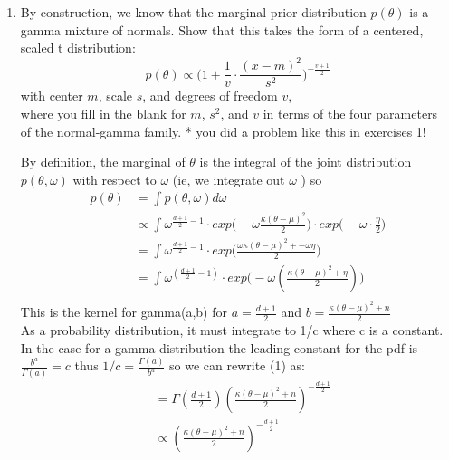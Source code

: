\documentclass{homework}
\begin{document}
\begin{enumerate}[label=(\Alph*)]
\item By construction, we know that the marginal prior distribution $p(\theta)$ is a gamma mixture of normals. Show that this takes the form of a centered, scaled t distribution:
$$p(\theta) \propto \big( 1 + \frac{1}{v} \cdot \frac{(x-m)^2}{s^2}\big)^{-\frac{v+1}{2}}$$
with center $m$, scale $s$, and degrees of freedom $v$, \\ where you fill in the blank for $m$, $s^2$, and $v$ in terms of the four parameters\\ of the normal-gamma family. * you did a problem like this in exercises 1!\\

\par \noindent By definition, the marginal of $\theta$ is the integral of the joint distribution $p(\theta,\omega)$ with respect to $\omega$ (ie, we integrate out $\omega$ ) so 
\begin{equation} \begin{split}
p(\theta) & = \int p(\theta, \omega) d\omega \\
& \propto \int  \omega^{\frac{d+1}{2} - 1 } \cdot exp\big( -\omega \frac{\kappa(\theta - \mu)^2}{2} \big)  \cdot exp\big( -\omega \cdot \frac{\eta}{2}\big)\\
& = \int \omega^{\frac{d+1}{2} - 1 } \cdot exp\big(  \frac{\omega\kappa(\theta - \mu)^2 + -\omega\eta}{2}\big) \\
& = \int \omega^{( \frac{d+1}{2} - 1) } \cdot exp\big(  - \omega ( \frac{\kappa(\theta - \mu)^2 + \eta}{2} )\big) \\
\end{split} \end{equation}
This is the kernel for gamma(a,b) for $a = \frac{d + 1}{2}$ and $b = \frac{\kappa(\theta - \mu)^2 + n}{2} $\\ As a probability distribution, it must integrate to 1/c where c is a constant. \\
In the case for a gamma distribution the leading constant for the pdf is \\$\frac{b^a}{\Gamma(a)} = c$ thus $1/c  =   \frac{\Gamma(a)}{b^a}$ so we can rewrite (1) as:
\begin{equation} \begin{split}
& = \Gamma(\frac{d+1}{2})( \frac{\kappa(\theta - \mu)^2 + n}{2} )^{-\frac{d+1}{2}} \\
& \propto ( \frac{\kappa(\theta - \mu)^2 + n}{2} )^{-\frac{d+1}{2}} \\

\end{split}
\end{equation}
\end{enumerate}
\end{document}
